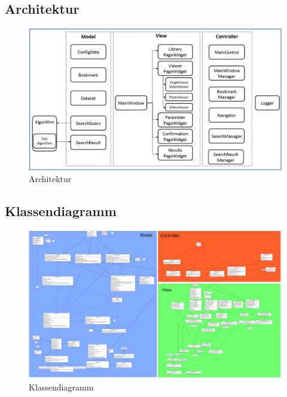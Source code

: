 \subsection{Architektur}

\begin{figure}[H]
\includegraphics[width=1\linewidth]{img/architektur}
\caption{Architektur}
\label{fig:architektur}
\end{figure}

\subsection{Klassendiagramm}

\begin{figure}[H]
	\includegraphics[width=1\linewidth]{img/Klassendiagramm/Complete}
	\caption{Klassendiagramm}
	\label{fig:klassendiagramm}
\end{figure}

